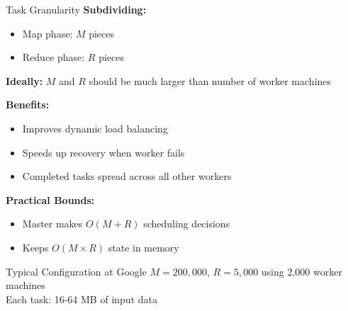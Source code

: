 \documentclass[aspectratio=169]{beamer}
\begin{document}
\begin{frame}{Task Granularity}
\textbf{Subdividing:}
\begin{itemize}
    \item Map phase: $M$ pieces
    \item Reduce phase: $R$ pieces
\end{itemize}

\vspace{0.3cm}

\textbf{Ideally:} $M$ and $R$ should be much larger than number of worker machines

\vspace{0.3cm}

\textbf{Benefits:}
\begin{itemize}
    \item Improves dynamic load balancing
    \item Speeds up recovery when worker fails
    \item Completed tasks spread across all other workers
\end{itemize}

\vspace{0.3cm}

\textbf{Practical Bounds:}
\begin{itemize}
    \item Master makes $O(M + R)$ scheduling decisions
    \item Keeps $O(M \times R)$ state in memory
\end{itemize}

\vspace{0.3cm}

\begin{exampleblock}{Typical Configuration at Google}
$M = 200,000$, $R = 5,000$ using 2,000 worker machines \\
Each task: 16-64 MB of input data
\end{exampleblock}
\end{frame}
\end{document}
